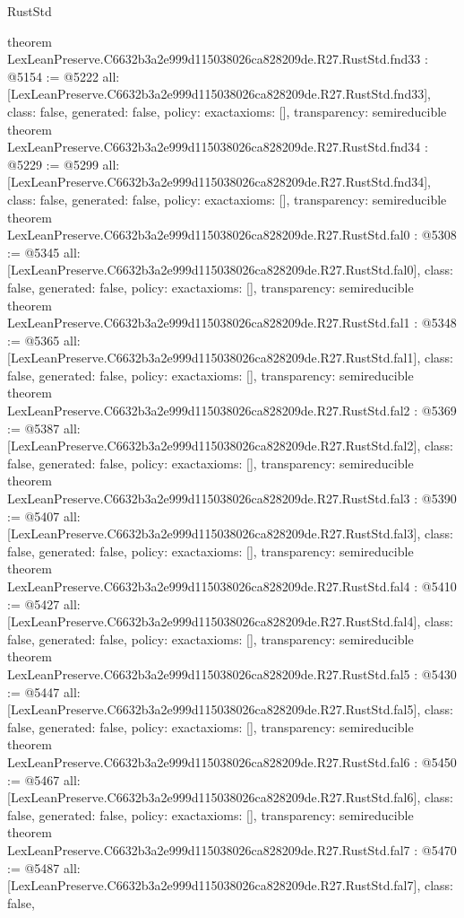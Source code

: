 \begin{lexlean}{RustStd}
\begin{coremodule}
{}
theorem LexLeanPreserve.C6632b3a2e999d115038026ca828209de.R27.RustStd.fnd33 : @5154 := @5222 {
  all: [LexLeanPreserve.C6632b3a2e999d115038026ca828209de.R27.RustStd.fnd33],
  class: false,
  generated: false,
  policy: exact{axioms: []},
  transparency: semireducible
}
theorem LexLeanPreserve.C6632b3a2e999d115038026ca828209de.R27.RustStd.fnd34 : @5229 := @5299 {
  all: [LexLeanPreserve.C6632b3a2e999d115038026ca828209de.R27.RustStd.fnd34],
  class: false,
  generated: false,
  policy: exact{axioms: []},
  transparency: semireducible
}
theorem LexLeanPreserve.C6632b3a2e999d115038026ca828209de.R27.RustStd.fal0 : @5308 := @5345 {
  all: [LexLeanPreserve.C6632b3a2e999d115038026ca828209de.R27.RustStd.fal0],
  class: false,
  generated: false,
  policy: exact{axioms: []},
  transparency: semireducible
}
theorem LexLeanPreserve.C6632b3a2e999d115038026ca828209de.R27.RustStd.fal1 : @5348 := @5365 {
  all: [LexLeanPreserve.C6632b3a2e999d115038026ca828209de.R27.RustStd.fal1],
  class: false,
  generated: false,
  policy: exact{axioms: []},
  transparency: semireducible
}
theorem LexLeanPreserve.C6632b3a2e999d115038026ca828209de.R27.RustStd.fal2 : @5369 := @5387 {
  all: [LexLeanPreserve.C6632b3a2e999d115038026ca828209de.R27.RustStd.fal2],
  class: false,
  generated: false,
  policy: exact{axioms: []},
  transparency: semireducible
}
theorem LexLeanPreserve.C6632b3a2e999d115038026ca828209de.R27.RustStd.fal3 : @5390 := @5407 {
  all: [LexLeanPreserve.C6632b3a2e999d115038026ca828209de.R27.RustStd.fal3],
  class: false,
  generated: false,
  policy: exact{axioms: []},
  transparency: semireducible
}
theorem LexLeanPreserve.C6632b3a2e999d115038026ca828209de.R27.RustStd.fal4 : @5410 := @5427 {
  all: [LexLeanPreserve.C6632b3a2e999d115038026ca828209de.R27.RustStd.fal4],
  class: false,
  generated: false,
  policy: exact{axioms: []},
  transparency: semireducible
}
theorem LexLeanPreserve.C6632b3a2e999d115038026ca828209de.R27.RustStd.fal5 : @5430 := @5447 {
  all: [LexLeanPreserve.C6632b3a2e999d115038026ca828209de.R27.RustStd.fal5],
  class: false,
  generated: false,
  policy: exact{axioms: []},
  transparency: semireducible
}
theorem LexLeanPreserve.C6632b3a2e999d115038026ca828209de.R27.RustStd.fal6 : @5450 := @5467 {
  all: [LexLeanPreserve.C6632b3a2e999d115038026ca828209de.R27.RustStd.fal6],
  class: false,
  generated: false,
  policy: exact{axioms: []},
  transparency: semireducible
}
theorem LexLeanPreserve.C6632b3a2e999d115038026ca828209de.R27.RustStd.fal7 : @5470 := @5487 {
  all: [LexLeanPreserve.C6632b3a2e999d115038026ca828209de.R27.RustStd.fal7],
  class: false,
}
\end{coremodule}
\end{lexlean}
